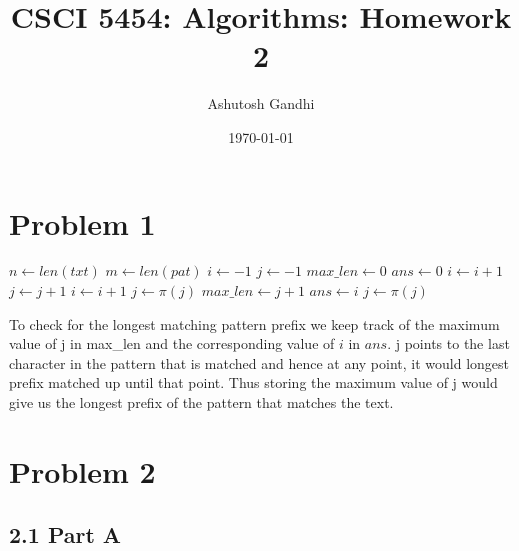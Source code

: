 \documentclass[12pt]{article}
\title{CSCI 5454: Algorithms: Homework 2}
\author{Ashutosh Gandhi}
\date{\today}
\begin{document}
\maketitle

\section*{Problem 1}


\vspace{10pt}



\begin{algorithmic}
\State $n \gets len(txt)$
\State $m \gets len(pat)$
\State $i \gets -1$ \quad {}
\State $j \gets -1$ \quad {}
\State $max\_len \gets 0$
\State $ans \gets 0$
\State $i \gets i+1$
\State $j \gets j+1$
\Else{}
\State $i \gets i+1$
\Else{}
\State $j \gets \pi(j)$
\EndIf
\EndIf
{} \quad {}
\State $max\_len \gets j+1$
\State $ans \gets i$
\EndIf
{} \quad {}
\State $j \gets \pi(j)$
\EndIf
\EndWhile
{}
\EndProcedure
\end{algorithmic}

To check for the longest matching pattern prefix we keep track of the maximum value of j in max\_len and the corresponding value of $i$ in $ans$. j points to the last character in the pattern that is matched and hence at any point, it would longest prefix matched up until that point. Thus storing the maximum value of j would give us the longest prefix of the pattern that matches the text. 


\section*{Problem 2}


\subsection*{2.1 Part A}
\vspace{10pt}
\end{document}
